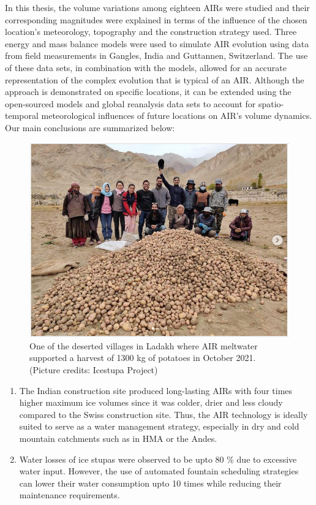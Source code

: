 In this thesis, the volume variations among eighteen \ac{AIRs} were studied and their corresponding magnitudes
were explained in terms of the influence of the chosen location's meteorology, topography and the construction
strategy used. Three energy and mass balance models were used to simulate AIR evolution using data from field
measurements in Gangles, India and Guttannen, Switzerland. The use of these data sets, in combination with the
models, allowed for an accurate representation of the complex evolution that is typical of an AIR.  Although the
approach is demonstrated on specific locations, it can be extended using the open-sourced models and global
reanalysis data sets to account for spatio-temporal meteorological influences of future locations on AIR's
volume dynamics. Our main conclusions are summarized below:

\begin{figure}[htb]
  \centering
	\includegraphics[width=8 cm]{figs/Kullum_potatoes}
	\caption{One of the deserted villages in Ladakh where AIR meltwater supported a harvest of 1300 kg of
		potatoes in October 2021. (Picture credits: Icestupa Project)}
	\label{fig:kullum_potatoes}
\end{figure}

\begin{enumerate}

  \item The Indian construction site produced long-lasting \ac{AIRs} with four times higher maximum ice volumes
    since it was colder, drier and less cloudy compared to the Swiss construction site. Thus, the \ac{AIR}
    technology is ideally suited to serve as a water management strategy, especially in dry and cold mountain
    catchments such as in \ac{HMA} or the Andes.

  \item Water losses of ice stupas were observed to be upto 80 \% due to excessive water input. However, the use
    of automated fountain scheduling strategies can lower their water consumption upto 10 times while reducing
    their maintenance requirements.

\end{enumerate}

